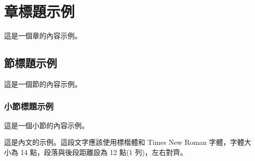 \documentclass[12pt]{report}
\begin{document}
\chapter{章標題示例}
這是一個章的內容示例。

\section{節標題示例}
這是一個節的內容示例。

\subsection{小節標題示例}
這是一個小節的內容示例。

這是內文的示例。這段文字應該使用標楷體和 Times New Roman 字體，字體大小為 14 點，段落與後段距離設為 12 點(1 列)，左右對齊。
\end{document}
